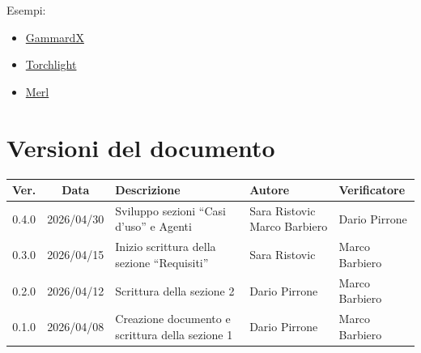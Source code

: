\documentclass[12pt, a4paper]{article}
\begin{document}
Esempi:

\begin{itemize}
\item
  \href{https://gammardx.github.io/Documents/Documenti\%20esterni/Analisi\%20dei\%20Requisiti\%20v2.0.0.pdf}{GammardX}
\item
  \href{https://torchlight-swe2324.github.io/docs/pb/Documentazione\%20Esterna/analisi_requisiti_v2.0.0.pdf}{Torchlight}
\item
  \href{https://merlunipd.github.io/login-warrior/output_documenti/esterni/AdR_V2.pdf}{Merl}
\end{itemize}

\newpage

\section*{Versioni del documento}
\begin{table}[h]
    \centering
    \renewcommand{\arraystretch}{1.3}
    \begin{tabularx}{\textwidth}{|c|c|X|l|l|}
        \hline
        \textbf{Ver.} & \textbf{Data} & \textbf{Descrizione} & \textbf{Autore} & \textbf{Verificatore} \\ \hline
        0.4.0 & 2026/04/30 & Sviluppo sezioni ``Casi d'uso'' e Agenti & Sara Ristovic \newline Marco Barbiero & Dario Pirrone \\ \hline
        0.3.0 & 2026/04/15 & Inizio scrittura della sezione ``Requisiti'' & Sara Ristovic & Marco Barbiero \\ \hline
        0.2.0 & 2026/04/12 & Scrittura della sezione 2 & Dario Pirrone & Marco Barbiero \\ \hline
        0.1.0 & 2026/04/08 & Creazione documento e scrittura della sezione 1 & Dario Pirrone & Marco Barbiero \\ \hline
        \end{tabularx}
\end{table}

\newpage


\tableofcontents
\iftotaltables  %
    \vspace{1cm}
    \listoftables
\fi
\end{document}
